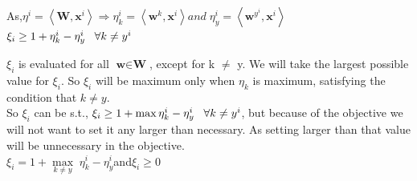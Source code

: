 \documentclass[a4paper,11pt]{article}
\begin{document}
\begin{mlsolution}
As,\begin{math} \eta ^{i} = \left \langle \textbf{W}, \textbf{x}^{i} \right \rangle \Rightarrow \eta_{k} ^{i} = \left \langle \textbf{w}^{k}, \textbf{x}^{i} \right \rangle  and \;\eta_{y} ^{i} = \left \langle \textbf{w}^{y^{i}}, \textbf{x}^{i} \right \rangle \end{math}\\

\begin{math}
\xi_{i} \geq 1 + \eta_{k}^{i} - \eta_{y} ^{i} \;\;\; \forall k\neq y^{i} \\
\end{math}

\begin{math}
\xi_{i}
\end{math} is evaluated for all \begin{math}\textbf{w} \in \textbf{W}\end{math}, except for k \begin{math}\neq\end{math} y. We will take the largest possible value for \begin{math}\xi_{i}\end{math}. So \begin{math}\xi_{i}\end{math} will be maximum only when \begin{math}\eta_{k}\end{math} is maximum, satisfying the condition that \begin{math}k \neq y\end{math}.\\

So \begin{math}\xi_{i}\end{math} can be s.t., \begin{math}
\xi_{i} \geq 1 + \max \eta_{k}^{i} - \eta_{y} ^{i} \;\;\; \forall k\neq y^{i} \\
\end{math}, but because of the objective we will not want to set it any larger than necessary. As setting larger than that value will be unnecessary in the objective.\\

\begin{math}\xi_{i} =   1 + \underset{k\neq y}{\max} \;\eta_{k}^{i} - \eta_{y} ^{i}  \end{math}\;and\;\begin{math} \xi_{i}\geq 0\end{math}


\end{mlsolution}
\end{document}
